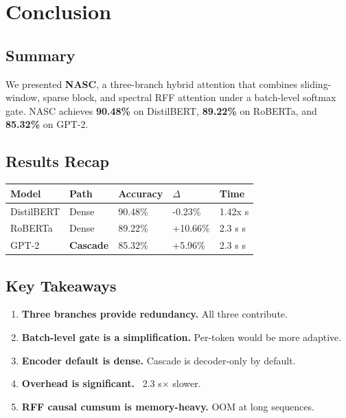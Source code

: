 \section{Conclusion}

\subsection{Summary}

We presented \textbf{NASC}, a three-branch hybrid attention that combines 
sliding-window, sparse block, and spectral RFF attention under a batch-level 
softmax gate. NASC achieves \textbf{90.48\%} on DistilBERT, \textbf{89.22\%} 
on RoBERTa, and \textbf{85.32\%} on GPT-2.

\subsection{Results Recap}

\begin{table}[H]
\centering
\small
\begin{tabular}{lllll}
\toprule
\textbf{Model} & \textbf{Path} & \textbf{Accuracy} & \textbf{$\Delta$} & \textbf{Time} \\
\midrule
DistilBERT & Dense & 90.48\% & -0.23\% & 1.42x s \\
RoBERTa & Dense & 89.22\% & +10.66\% & 2.3 s s \\
GPT-2 & \textbf{Cascade} & 85.32\% & +5.96\% & 2.3 s s \\
\bottomrule
\end{tabular}
\end{table}

\subsection{Key Takeaways}

\begin{enumerate}
\item \textbf{Three branches provide redundancy.} All three contribute.
\item \textbf{Batch-level gate is a simplification.} Per-token would be more
  adaptive.
\item \textbf{Encoder default is dense.} Cascade is decoder-only by default.
\item \textbf{Overhead is significant.} ~2.3 s$\times$ slower.
\item \textbf{RFF causal cumsum is memory-heavy.} OOM at long sequences.

\end{enumerate}
